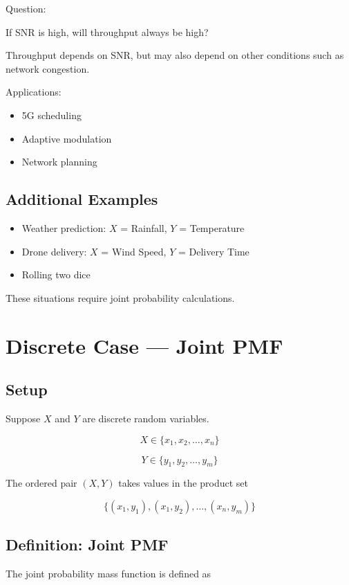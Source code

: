 \documentclass[11pt]{article}
\begin{document}
Question:

If SNR is high, will throughput always be high?

Throughput depends on SNR, but may also depend on other conditions such as network congestion.

Applications:
\begin{itemize}[noitemsep]
\item 5G scheduling
\item Adaptive modulation
\item Network planning
\end{itemize}

\subsection*{Additional Examples}

\begin{itemize}[noitemsep]
\item Weather prediction: $X$ = Rainfall, $Y$ = Temperature
\item Drone delivery: $X$ = Wind Speed, $Y$ = Delivery Time
\item Rolling two dice
\end{itemize}

These situations require joint probability calculations.

\section{Discrete Case — Joint PMF}

\subsection{Setup}

Suppose $X$ and $Y$ are discrete random variables.

\[
X \in \{x_1, x_2, \ldots, x_n\}
\]

\[
Y \in \{y_1, y_2, \ldots, y_m\}
\]

The ordered pair $(X,Y)$ takes values in the product set

\[
\{(x_1,y_1),(x_1,y_2),\ldots,(x_n,y_m)\}
\]

\subsection{Definition: Joint PMF}

The joint probability mass function is defined as
\end{document}
